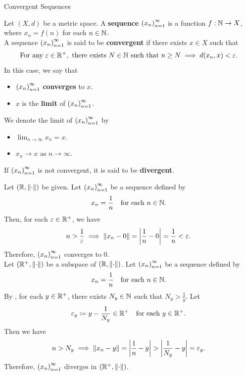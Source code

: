 \begin{section}{Convergent Sequences}

Let $(X, d)$ be a metric space. A \textbf{sequence} $\paren*{x_{n}}_{n = 1}^{\infty}$
is a function $f: \N \to X$, where $x_{n} = f(n)$ for each $n \in \N$.
\\[6mm]
A sequence $\paren*{x_{n}}_{n = 1}^{\infty}$ is said to be \textbf{convergent} if there exists $x \in X$ such that
\[
\text{For any } \veps \in \R^{+}, \text{ there exists } N \in \N \text{ such that } n \geq N \implies d(x_{n}, x) < \veps.
\]
In this case, we say that
\begin{itemize}
    \item $\paren*{x_{n}}_{n = 1}^{\infty}$ \textbf{converges} to $x$.
    \item $x$ is the \textbf{limit} of $\paren*{x_{n}}_{n = 1}^{\infty}$.
\end{itemize}
We denote the limit of $\paren*{x_{n}}_{n = 1}^{\infty}$ by
\begin{itemize}
    \item $\displaystyle \lim_{n \to \infty} x_{n} = x$.
    \item $x_{n} \to x$ as $n \to \infty$.
\end{itemize}
If $\paren*{x_{n}}_{n = 1}^{\infty}$ is not convergent, it is said to be \textbf{divergent}.

\bigskip

\begin{example}
    Let $\paren*{\R, \norm*{\cdot}}$ be given. Let $\paren*{x_{n}}_{n = 1}^{\infty}$ be a sequence defined by
    \[
    x_{n} = \frac{1}{n} \quad \text{for each } n \in \N.
    \]
    Then, for each $\veps \in \R^{+}$, we have
    \[
    n > \frac{1}{\veps} \implies \norm*{x_{n} - 0} = \abs*{\frac{1}{n} - 0} = \frac{1}{n} < \veps.
    \]
    Therefore, $\paren*{x_{n}}_{n = 1}^{\infty}$ converges to $0$.
    \\[6mm]
    Let $\paren*{\R^{+}, \norm*{\cdot}}$ be a subspace of $\paren*{\R, \norm*{\cdot}}$.
    Let $\paren*{x_{n}}_{n = 1}^{\infty}$ be a sequence defined by
    \[
    x_{n} = \frac{1}{n} \quad \text{for each } n \in \N.
    \]
    By , for each $y \in \R^{+}$, there exists $N_{y} \in \N$ such that $N_{y} >
    \frac{1}{y}$. Let
    \[
    \veps_{y} \coloneqq y - \frac{1}{N_{y}} \in \R^{+} \quad \text{for each } y \in \R^{+}.
    \]
    Then we have
    \[
    n > N_{y} \implies \norm*{x_{n} - y} = \abs*{\frac{1}{n} - y} > \abs*{\frac{1}{N_{y}} - y} = \veps_{y}.
    \]
    Therefore, $\paren*{x_{n}}_{n = 1}^{\infty}$ diverges in $\paren*{\R^{+}, \norm*{\cdot}}$.
\end{example}


\end{section}
